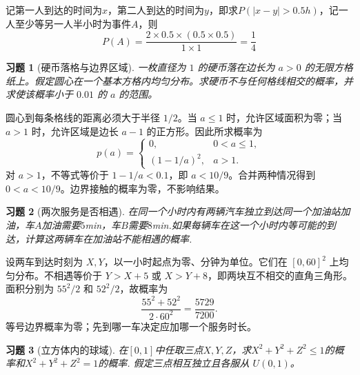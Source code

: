 \documentclass[12pt,fontset=fandol]{ctexart}
\newtheorem{exercise}{习题}[section]
\begin{document}
\begin{solve}\label{a:Y1.12}
记第一人到达的时间为$x$，第二人到达的时间为$y$，即求$P(|x-y|>0.5h)$，记一人至少等另一人半小时为事件$A$，则
\[P(A) = \frac{{2 \times 0.5 \times (0.5 \times 0.5)}}{1\times 1} = \frac{1}{4}\]
\end{solve}

\begin{exercise}[硬币落格与边界区域]\label{q:Y1.13}
一枚直径为 $1$ 的硬币落在边长为 $a>0$ 的无限方格纸上。假定圆心在一个基本方格内均匀分布。求硬币不与任何格线相交的概率，并求使该概率小于 $0.01$ 的 $a$ 的范围。\par{}
\end{exercise}

\begin{solve}\label{a:Y1.13}圆心到每条格线的距离必须大于半径 $1/2$。当 $a\le1$ 时，允许区域面积为零；当 $a>1$ 时，允许区域是边长 $a-1$ 的正方形。因此所求概率为\[p(a)=\begin{cases}0,&0<a\le1,\\(1-1/a)^2,&a>1.\end{cases}\]对 $a>1$，不等式等价于 $1-1/a<0.1$，即 $a<10/9$。合并两种情况得到 $0<a<10/9$。边界接触的概率为零，不影响结果。\end{solve}

\begin{exercise}[两次服务是否相遇]\label{q:Y1.14}
在同一个小时内有两辆汽车独立到达同一个加油站加油，车$A$加油需要$5$min，车$B$需要$8$min.如果每辆车在这一个小时内等可能的到达，计算这两辆车在加油站不能相遇的概率.\par{}
\end{exercise}

\begin{solve}\label{a:Y1.14}设两车到达时刻为 $X,Y$，以一小时起点为零、分钟为单位。它们在 $[0,60]^2$ 上均匀分布。不相遇等价于 $Y>X+5$ 或 $X>Y+8$，即两块互不相交的直角三角形。面积分别为 $55^2/2$ 和 $52^2/2$，故概率为\[\frac{55^2+52^2}{2\cdot60^2}=\frac{5729}{7200}.\]等号边界概率为零；先到哪一车决定应加哪一个服务时长。\end{solve}

\begin{exercise}[立方体内的球域]\label{q:Y1.15}
在$[0,1]$中任取三点$X,Y,Z$，求$X^2+Y^2+Z^2\leqslant 1$的概率和$X^2+Y^2+Z^2=1$的概率. 假定三点相互独立且各服从 $U(0,1)$。\par{}
\end{exercise}
\end{document}
